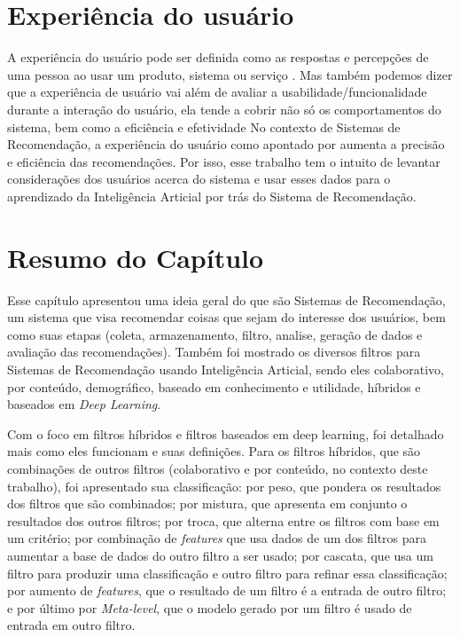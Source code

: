 
\section{Experiência do usuário}\label{sec:expus}
A experiência do usuário pode ser definida como as respostas e percepções de uma pessoa ao usar um produto, sistema ou serviço
\cite{iso9241-210}. Mas também podemos dizer que a experiência de usuário vai além de avaliar a usabilidade/funcionalidade durante
a interação do usuário, ela tende a cobrir não só os comportamentos do sistema, bem como a eficiência e efetividade \cite{allam2013user}
No contexto de Sistemas de Recomendação, a experiência do usuário como apontado por \cite{8673410} aumenta a precisão e eficiência
das recomendações. Por isso, esse trabalho tem o intuito de levantar considerações dos usuários acerca do sistema e usar esses
dados para o aprendizado da Inteligência Articial por trás do Sistema de Recomendação. 

\section{Resumo do Capítulo}\label{sec:resrefteor}

Esse capítulo apresentou uma ideia geral do que são Sistemas de Recomendação, um sistema que visa recomendar coisas que 
sejam do interesse dos usuários, bem como suas etapas (coleta, armazenamento, filtro, analise, geração de dados e 
avaliação das recomendações). Também foi mostrado os diversos filtros para Sistemas de Recomendação usando Inteligência 
Articial, sendo eles colaborativo, por conteúdo, demográfico, baseado em conhecimento e utilidade, híbridos e baseados em
\textit{Deep Learning}.

Com o foco em filtros híbridos e filtros baseados em deep learning, foi detalhado mais como eles funcionam e suas definições.
Para os filtros híbridos, que são combinações de outros filtros (colaborativo e por conteúdo, no contexto deste trabalho),
foi apresentado sua classificação: por peso, que pondera os resultados dos filtros que são combinados; por mistura, que 
apresenta em conjunto o resultados dos outros filtros; por troca, que alterna entre os filtros com base em um critério;
por combinação de \textit{features} que usa dados de um dos filtros para aumentar a base de dados do outro filtro a ser usado;
por cascata, que usa um filtro para produzir uma classificação e outro filtro para refinar essa classificação; por aumento
de \textit{features}, que o resultado de um filtro é a entrada de outro filtro; e por último por \textit{Meta-level}, que
o modelo gerado por um filtro é usado de entrada em outro filtro.

